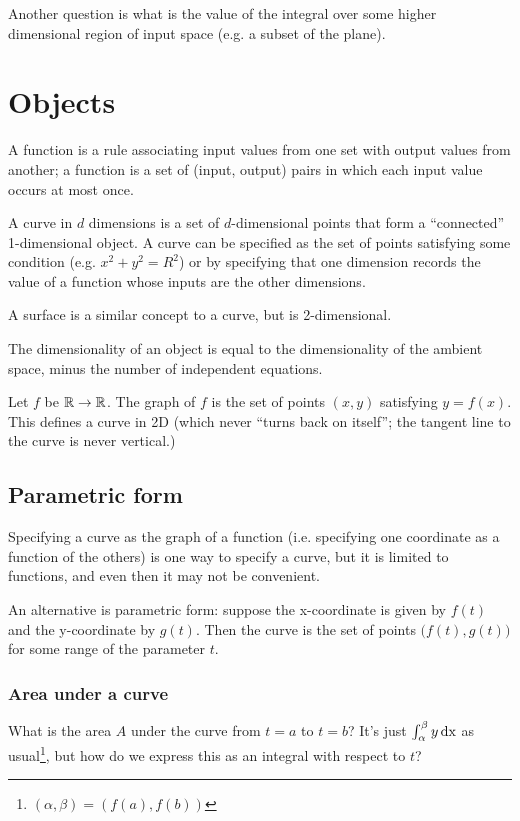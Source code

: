 \documentclass[12pt]{article}
\begin{document}
Another question is what is the value of the integral over some higher
dimensional region of input space (e.g. a subset of the plane).

\section*{Objects}

A function is a rule associating input values from one set with output values
from another; a function is a set of (input, output) pairs in which each input
value occurs at most once.

A curve in $d$ dimensions is a set of $d$-dimensional points that form a
``connected'' 1-dimensional object. A curve can be specified as the set of
points satisfying some condition (e.g. $x^2 + y^2 = R^2$) or by specifying that
one dimension records the value of a function whose inputs are the other
dimensions.

A surface is a similar concept to a curve, but is 2-dimensional.

The dimensionality of an object is equal to the dimensionality of the ambient
space, minus the number of independent equations.

Let $f$ be $\mathbb{R} \to \mathbb{R}$. The graph of $f$ is the set of points $(x,y)$
satisfying $y = f(x)$. This defines a curve in 2D (which never ``turns back on
itself''; the tangent line to the curve is never vertical.)

\subsection*{Parametric form}

Specifying a curve as the graph of a function (i.e. specifying one coordinate
as a function of the others) is one way to specify a curve, but it is limited
to functions, and even then it may not be convenient.

An alternative is parametric form: suppose the x-coordinate is given by $f(t)$
and the y-coordinate by $g(t)$. Then the curve is the set of points
$\big(f(t), g(t)\big)$ for some range of the parameter $t$.

\subsubsection*{Area under a curve}

What is the area $A$ under the curve from $t=a$ to $t=b$? It's just
$\int_\alpha^\beta y \operatorname{\text{dx}}$ as usual\footnote{$(\alpha, \beta) = (f(a), f(b))$},
but how do we express this as an integral with respect to $t$?
\end{document}
